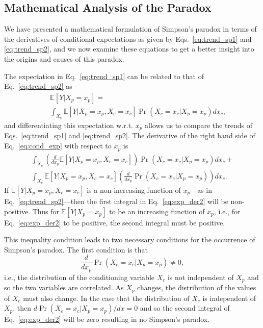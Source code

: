\subsection{Mathematical Analysis of the Paradox}
\label{sec:math}
We have presented a mathematical formulation of Simpson's paradox in terms of the derivatives of conditional expectations as given by Eqs.~\eqref{eq:trend_sp1} and \eqref{eq:trend_sp2}, and
we now examine these equations to get a better insight into the origins and causes of this paradox.

The expectation in Eq.~\eqref{eq:trend_sp1} can be related to that of Eq.~\eqref{eq:trend_sp2} as
\begin{eqnarray}
	& & \mathbb{E}[Y|X_p =  x_p] = \label{eq:cond_exp} \\ \nonumber
 & & \int_{X_c}\mathbb{E}[Y|X_p = x_p, X_c = x_c]\Pr(X_c=x_c|X_p=x_p)dx_c,
\end{eqnarray}
and differentiating this expectation w.r.t. $x_p$ allows us to compare the trends of Eqs.~\eqref{eq:trend_sp1} and \eqref{eq:trend_sp2}. The derivative of the right hand side of Eq.~\eqref{eq:cond_exp} with respect to $x_p$ is
\begin{align}
	\int_{X_c}\left(\frac{d}{dx_p}\mathbb{E}[Y|X_p = x_p, X_c = x_c]\right)\Pr(X_c=x_c|X_p=x_p)dx_c + \nonumber \\
	\int_{X_c}\mathbb{E}[Y|X_p = x_p, X_c = x_c]\left(\frac{d}{dx_p}\Pr(X_c=x_c|X_p=x_p)\right)dx_c.
\label{eq:exp_der2}
\end{align}
If $\mathbb{E}[Y|X_p = x_p, X_c = x_c]$ is a non-increasing function of $x_p$---as in Eq.~\eqref{eq:trend_sp2}---then the first integral in Eq.~\eqref{eq:exp_der2} will be non-positive. Thus for $\mathbb{E}[Y|X_p = x_p]$ to be an increasing function of $x_p$, i.e., for Eq.~\eqref{eq:exp_der2} to be positive, the second integral must be positive.

This inequality condition leads to two necessary conditions for the occurrence of Simpson's paradox. The first condition is that
\begin{equation}
	\frac{d}{dx_p}\Pr(X_c=x_c|X_p=x_p) \neq 0,
        \label{eq:SPcond1}
\end{equation}
i.e., the distribution of the conditioning variable $X_c$ is not independent of $X_p$ and so the two variables are correlated. As $X_p$ changes, the distribution of the values of $X_c$ must also change. In the case that the distribution of $X_c$ is independent of $X_p$, then $d\Pr(X_c=x_c|X_p=x_p)/dx = 0$ and so the second integral of Eq.~\eqref{eq:exp_der2} will be zero resulting in no Simpson's paradox.

